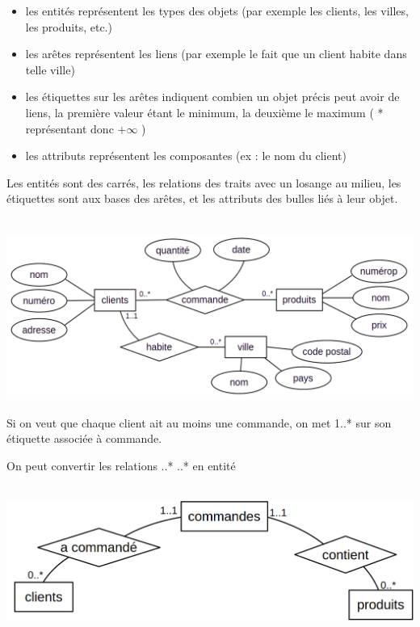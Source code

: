 \begin{idee}
	\begin{itemize}
		\item les entités représentent les types des objets (par exemple les clients, les villes, les produits, etc.)
		\item les arêtes représentent les liens (par exemple le fait que un client habite dans telle ville)
		\item les étiquettes sur les arêtes indiquent combien un objet précis peut avoir de liens, la première valeur étant le minimum, la deuxième le maximum ( * représentant donc $+\infty$ )
		\item les attributs représentent les composantes (ex : le nom du client)
	\end{itemize}
\end{idee}

\begin{personalise}[Représentation]
	Les entités sont des carrés, les relations des traits avec un losange au milieu, les étiquettes sont aux bases des arêtes, et les attributs des bulles liés à leur objet.
\end{personalise}

\begin{example}\\
	\includegraphics[width=\linewidth]{lecon/27-relationnel-bd/exemple_relationnel.png}
\end{example}

\begin{rem}
	Si on veut que chaque client ait au moins une commande, on met 1..* sur son étiquette associée à commande.
\end{rem}

\begin{proposition}
	On peut convertir les relations ..* ..* en entité
\end{proposition}

\begin{example}\\
	\includegraphics[width=0.8\linewidth]{lecon/27-relationnel-bd/changement_reltionnel.png}
\end{example}

